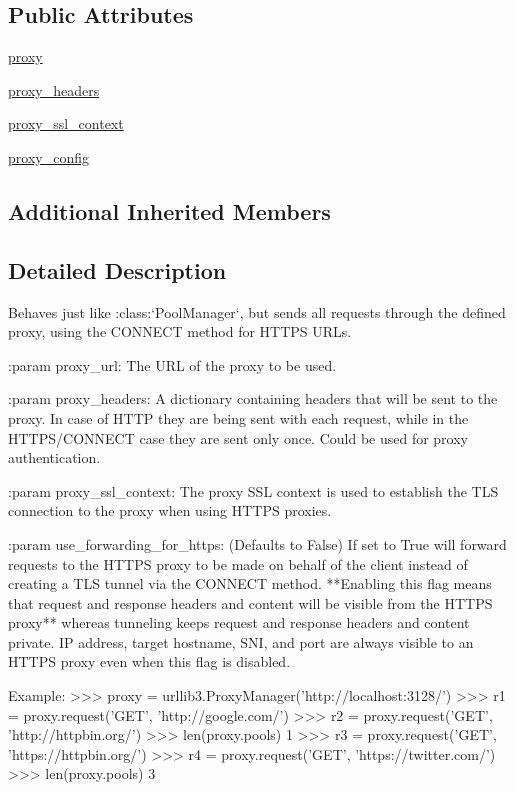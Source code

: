 \subsection*{Public Attributes}
\begin{DoxyCompactItemize}
\item 
\hyperlink{classpip_1_1__vendor_1_1urllib3_1_1poolmanager_1_1ProxyManager_a1eb61252145626a37aca86cd9be1fa6d}{proxy}
\item 
\hyperlink{classpip_1_1__vendor_1_1urllib3_1_1poolmanager_1_1ProxyManager_ae2670de8938cd39588e6e17189177cd7}{proxy\+\_\+headers}
\item 
\hyperlink{classpip_1_1__vendor_1_1urllib3_1_1poolmanager_1_1ProxyManager_aa22b381efad94c37841182b63c06b2d3}{proxy\+\_\+ssl\+\_\+context}
\item 
\hyperlink{classpip_1_1__vendor_1_1urllib3_1_1poolmanager_1_1ProxyManager_a09bc39eb1fc0430b5bbc00ec05d1c741}{proxy\+\_\+config}
\end{DoxyCompactItemize}
\subsection*{Additional Inherited Members}


\subsection{Detailed Description}
\begin{DoxyVerb}Behaves just like :class:`PoolManager`, but sends all requests through
the defined proxy, using the CONNECT method for HTTPS URLs.

:param proxy_url:
    The URL of the proxy to be used.

:param proxy_headers:
    A dictionary containing headers that will be sent to the proxy. In case
    of HTTP they are being sent with each request, while in the
    HTTPS/CONNECT case they are sent only once. Could be used for proxy
    authentication.

:param proxy_ssl_context:
    The proxy SSL context is used to establish the TLS connection to the
    proxy when using HTTPS proxies.

:param use_forwarding_for_https:
    (Defaults to False) If set to True will forward requests to the HTTPS
    proxy to be made on behalf of the client instead of creating a TLS
    tunnel via the CONNECT method. **Enabling this flag means that request
    and response headers and content will be visible from the HTTPS proxy**
    whereas tunneling keeps request and response headers and content
    private.  IP address, target hostname, SNI, and port are always visible
    to an HTTPS proxy even when this flag is disabled.

Example:
    >>> proxy = urllib3.ProxyManager('http://localhost:3128/')
    >>> r1 = proxy.request('GET', 'http://google.com/')
    >>> r2 = proxy.request('GET', 'http://httpbin.org/')
    >>> len(proxy.pools)
    1
    >>> r3 = proxy.request('GET', 'https://httpbin.org/')
    >>> r4 = proxy.request('GET', 'https://twitter.com/')
    >>> len(proxy.pools)
    3\end{DoxyVerb}
 

